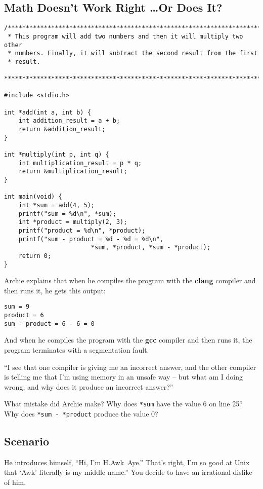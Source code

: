 \subsection{Math Doesn't Work Right \dots Or Does It?} \label{subsec:danglingPointers}

\transitionone

\begin{lstlisting}
/***********************************************************************
 * This program will add two numbers and then it will multiply two other
 * numbers. Finally, it will subtract the second result from the first
 * result.
 ***********************************************************************/

#include <stdio.h>

int *add(int a, int b) {
    int addition_result = a + b;
    return &addition_result;
}

int *multiply(int p, int q) {
    int multiplication_result = p * q;
    return &multiplication_result;
}

int main(void) {
    int *sum = add(4, 5);
    printf("sum = %d\n", *sum);
    int *product = multiply(2, 3);
    printf("product = %d\n", *product);
    printf("sum - product = %d - %d = %d\n",
                        *sum, *product, *sum - *product);
    return 0;
}
\end{lstlisting}

Archie explains that when he compiles the program with the \textbf{clang} compiler and then runs it, he gets this output:

\begin{verbatim}
sum = 9
product = 6
sum - product = 6 - 6 = 0
\end{verbatim}

And when he compiles the program with the \textbf{gcc} compiler and then runs it, the program terminates with a segmentation fault.

``I see that one compiler is giving me an incorrect answer, and the other compiler is telling me that I'm using memory in an unsafe way -- but what am I doing wrong, and why does it produce an incorrect answer?''

What mistake did Archie make?
Why does \lstinline{*sum} have the value 6 on line 25?
Why does \lstinline{*sum - *product} produce the value 0?
\begin{description}
\end{description}


\subsection{Scenario}

\transitiontwo


He introduces himself, ``Hi, I'm H.Awk~Aye.'' That's right, I'm so good at Unix that `Awk' literally is my middle name.''
You decide to have an irrational dislike of him.

\transitionthree

\transitionfour

